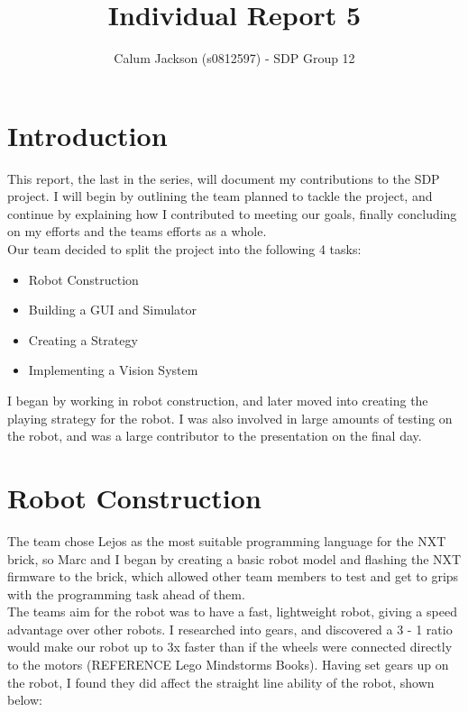 \documentclass[12pt]{IEEEtran}
\begin{document}
	
\title{Individual Report 5}

\author{Calum Jackson (s0812597) - 
SDP Group 12}

\maketitle


\section{Introduction}
This report, the last in the series, will document my contributions to the SDP project. I will begin by outlining the team planned to tackle the project, and continue by explaining how I contributed to meeting our goals, finally concluding on my efforts and the teams efforts as a whole.\\
Our team decided to split the project into the following 4 tasks:
\begin{itemize}
\item Robot Construction
\item Building a GUI and Simulator
\item Creating a Strategy
\item Implementing a Vision System
\end{itemize}

I began by working in robot construction, and later moved into creating the playing strategy for the robot. I was also involved in large amounts of testing on the robot, and was a large contributor to the presentation on the final day.

\section{Robot Construction}
The team chose Lejos as the most suitable programming language for the NXT brick, so Marc and I began by creating a basic robot model and flashing the NXT firmware to the brick, which allowed other team members to test and get to grips with the programming task ahead of them. \\

The teams aim for the robot was to have a fast, lightweight robot, giving a speed advantage over other robots. I researched into gears, and discovered a 3 - 1 ratio would make our robot up to 3x faster than if the wheels were connected directly to the motors (REFERENCE Lego Mindstorms Books). Having set gears up on the robot, I found they did affect the straight line ability of the robot, shown below:
\end{document}
